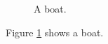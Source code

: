 \documentclass{article}
\begin{document}
\begin{figure}[h!]
  \caption{A boat.}
  \label{fig:boat1}
\end{figure}

Figure \ref{fig:boat1} shows a boat.
\end{document}
